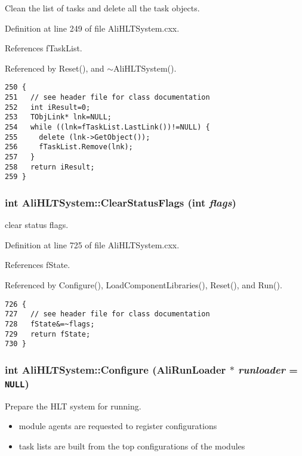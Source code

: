 Clean the list of tasks and delete all the task objects. 

Definition at line 249 of file Ali\-HLTSystem.cxx.

References f\-Task\-List.

Referenced by Reset(), and $\sim$Ali\-HLTSystem().

\footnotesize\begin{verbatim}250 {
251   // see header file for class documentation
252   int iResult=0;
253   TObjLink* lnk=NULL;
254   while ((lnk=fTaskList.LastLink())!=NULL) {
255     delete (lnk->GetObject());
256     fTaskList.Remove(lnk);
257   }
258   return iResult;
259 }
\end{verbatim}\normalsize 


\subsubsection{\setlength{\rightskip}{0pt plus 5cm}int Ali\-HLTSystem::Clear\-Status\-Flags (int {\em flags})\hspace{0.3cm}{\tt  [private]}}\label{classAliHLTSystem_d1}


clear status flags. 

Definition at line 725 of file Ali\-HLTSystem.cxx.

References f\-State.

Referenced by Configure(), Load\-Component\-Libraries(), Reset(), and Run().

\footnotesize\begin{verbatim}726 {
727   // see header file for class documentation
728   fState&=~flags;
729   return fState;
730 }
\end{verbatim}\normalsize 


\subsubsection{\setlength{\rightskip}{0pt plus 5cm}int Ali\-HLTSystem::Configure (Ali\-Run\-Loader $\ast$ {\em runloader} = {\tt NULL})}\label{classAliHLTSystem_a24}


Prepare the HLT system for running.\begin{itemize}
\item module agents are requested to register configurations\item task lists are built from the top configurations of the modules 
\end{itemize}


